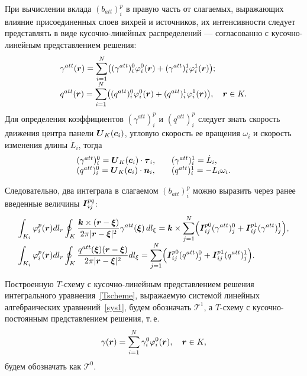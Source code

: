 \documentclass[12pt, a4paper]{article}
\renewcommand{\vec}[1]{\text{\mathversion{bold}${#1}$}}%
\begin{document}
При вычислении вклада $(b_{att})_i^p$ в правую часть от слагаемых, выражающих влияние присоединенных слоев вихрей и источников, их интенсивности следует представлять в виде кусочно-линейных распределений --- согласованно с кусочно-линейным представлением решения:
\[
\begin{array}{@{}l@{}}
\displaystyle \gamma^{att}(\vec r) = \sum_{i=1}^N \bigl((\gamma^{att})_i^0 \varphi_i^0(\vec r) + (\gamma^{att})_i^1 \varphi_i^1(\vec r)\bigr);
\\
\displaystyle q^{att}(\vec r) = \sum_{i=1}^N \bigl((q^{att})_i^0 \varphi_i^0(\vec r) + (q^{att})_i^1 \varphi_i^1(\vec r)\bigr), \quad \vec r \in K.
\end{array}
\]
Для определения коэффициентов $(\gamma^{att})_i^p$ и $(q^{att})_i^p$ следует знать скорость движения центра панели $\vec U_K(\vec c_i)$, угловую скорость ее вращения $\omega_i$ и скорость изменения длины $\dot L_i$, тогда
\[
\begin{array}{@{}l@{\qquad}l@{}}
(\gamma^{att})_i^0 = \vec U_K(\vec c_i) \cdot \vec \tau_i,  &
(\gamma^{att})_i^1 = \dot L_i,\\
(q^{att})_i^0 = \vec U_K(\vec c_i) \cdot \vec n_i,  &
(q^{att})_i^1 = -L_i \omega_i.
\end{array}
\]

Следовательно, два интеграла в слагаемом $(b_{att})_i^p$ можно выразить через ранее введенные величины $\vec I_{ij}^{pq}$:
\[
\begin{array}{@{}l@{}}
\displaystyle \int_{K_i}  \varphi _{i}^{p} (\vec{r}) dl_r \oint_{K} \frac{\vec k \times (\vec r - \vec \xi)}{2\pi|\vec r - \vec \xi|^2}\gamma^{att}(\vec\xi)\,dl_\xi = \vec k \times  \sum\limits_{j=1}^N \Bigl(\vec I_{ij}^{p0} (\gamma^{att})_j^0 + \vec I_{ij}^{p1} (\gamma^{att})_j^1 \Bigr),\\
\displaystyle \int_{K_i}  \varphi _{i}^{p} (\vec{r}) dl_r \oint_{K} \frac{q^{att}(\vec\xi) (\vec r - \vec \xi)}{2\pi|\vec r - \vec \xi|^2} dl_\xi = \sum\limits_{j=1}^N \Bigl(\vec I_{ij}^{p0} (q^{att})_j^0 + \vec I_{ij}^{p1} (q^{att})_j^1 \Bigr).
\end{array}
\]

Построенную $T$-схему с кусочно-линейным представлением решения интегрального уравнения~\eqref{Tscheme}, выражаемую системой линейных алгебраических уравнений~\eqref{sys1}, будем обозначать $\mathcal{T}^1$, а $T$-схему с кусочно-постоянным представлением решения, т.\,е.
\[
	\label{gamma0}
	\gamma(\vec r) = \sum_{i=1}^N \gamma_i^0 \varphi_i^0(\vec r), \quad \vec r \in K,
\]
будем обозначать как  $\mathcal{T}^0$.
\end{document}
